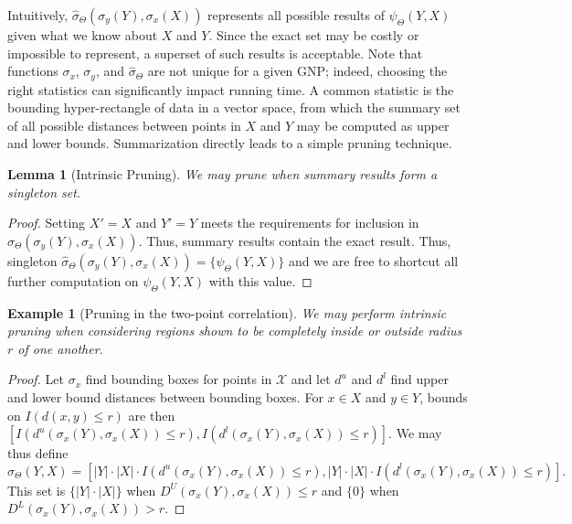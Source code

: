 \documentclass{article}
\newtheorem{lemma}{Lemma}
\newtheorem{example} {Example}
\newcommand{\maybekillspace}{\vspace{-0.05in}}
\newcommand{\killspace}{\vspace{-0.1in}}
\newcommand{\GNP}[1][\psi]{{#1}_{\Theta}}
\newcommand{\sigmahat}{\mathbin{\widehat{\sigma}}}
\newcommand{\disthrectmin}{d^{l}}
\newcommand{\disthrectmax}{d^{u}}
\begin{document}
\noindent Intuitively, $\GNP[\sigmahat](\sigma_y(Y),\sigma_x(X))$ represents all possible results of $\GNP(Y,X)$ given what we know about $X$ and $Y$.
Since the exact set may be costly or impossible to represent, a superset of such results is acceptable.
Note that functions $\sigma_x$, $\sigma_y$, and $\GNP[\sigmahat]$ are not unique for a given GNP; indeed, choosing the right statistics can significantly impact running time.
A common statistic is the bounding hyper-rectangle of data in a vector space, from which the summary set of all possible distances between points in $X$ and $Y$ may be computed as upper and lower bounds.
Summarization directly leads to a simple pruning technique.


\begin{lemma}[Intrinsic Pruning]
  We may prune when summary results form a singleton set.
\end{lemma}
\killspace
\begin{proof}
  Setting $X' = X$ and $Y' = Y$ meets the requirements for inclusion in $\GNP[\sigmahat](\sigma_y(Y),\sigma_x(X))$.
  Thus, summary results contain the exact result.
  Thus, singleton $\GNP[\sigmahat](\sigma_y(Y),\sigma_x(X)) = \{\GNP(Y,X)\}$ and we are free to shortcut all further computation on $\GNP(Y,X)$ with this value.
\end{proof}
\killspace
\begin{example}[Pruning in the two-point correlation]
  We may perform intrinsic pruning when considering regions shown to
  be completely inside or outside radius $r$ of one another.
\end{example}
\killspace
\begin{proof}
  Let $\sigma_x$ find bounding boxes for points in $\mathcal{X}$ and
  let $\disthrectmax$ and $\disthrectmin$ find upper and lower bound distances between bounding boxes.
  For $x \in X$ and $y \in Y$, bounds on $I(d(x,y) \leq r)$ are then $\left[
  I(\disthrectmax(\sigma_x(Y),\sigma_x(X)) \leq r),
  I(\disthrectmin(\sigma_x(Y),\sigma_x(X)) \leq r) \right]$.
  We may thus define
  \[
  \GNP[\sigmahat](Y,X) = \left[ |Y| \cdot |X| \cdot I(\disthrectmax(\sigma_x(Y),\sigma_x(X)) \leq r), |Y| \cdot |X| \cdot I(\disthrectmin(\sigma_x(Y),\sigma_x(X)) \leq r) \right].
  \]
  This set is $\{|Y| \cdot |X|\}$ when
  $D^{\!U}(\sigma_x(Y),\sigma_x(X)) \leq r$ and $\{0\}$ when
  $D^{\!L}(\sigma_x(Y),\sigma_x(X)) > r$.
\end{proof}
\maybekillspace
\end{document}
